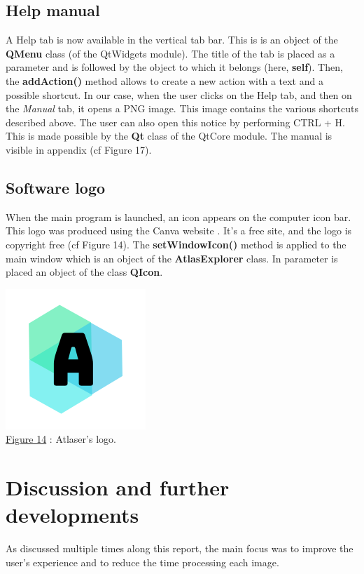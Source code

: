 \documentclass[a4paper,12pt]{report}
\begin{document}
\subsection{Help manual}
A Help tab is now available in the vertical tab bar. This is is an object of the \textbf{QMenu} class (of the QtWidgets module). The title of the tab is placed as a parameter and is followed by the object to which it belongs (here, \textbf{self}). Then, the \textbf{addAction()} method allows to create a new action with a text and a possible shortcut. In our case, when the user clicks on the Help tab, and then on the \textit{Manual} tab, it opens a PNG image. This image contains the various shortcuts described above. The user can also open this notice by performing CTRL + H. This is made possible by the \textbf{Qt} class of the QtCore module. The manual is visible in appendix (cf Figure 17). \\ 

\subsection{Software logo}
When the main program is launched, an icon appears on the computer icon bar. This logo was produced using the Canva website \cite{canva}. It's a free site, and the logo is copyright free (cf Figure 14). The \textbf{setWindowIcon()} method is applied to the main window which is an object of the \textbf{AtlasExplorer} class. In parameter is placed an object of the class \textbf{QIcon}.
\begin{center} \includegraphics[scale=0.40]{logo.png}\\
\underline{Figure 14} : Atlaser's logo. \vspace{1\baselineskip}\\ \end{center}

\section{Discussion and further developments}
As discussed multiple times along this report, the main focus was to improve the user's experience and to reduce the time processing each image.\\
\end{document}
